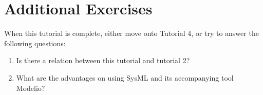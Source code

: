 \documentclass[11pt,a4paper]{../tutorial}
\begin{document}
\section{Additional Exercises}

When this tutorial is complete, either move onto Tutorial 4, or try to answer the following questions:

\begin{enumerate}
  \item Is there a relation between this tutorial and tutorial 2?
  \item What are the advantages on using SysML and its accompanying tool Modelio?
\end{enumerate}
\end{document}
